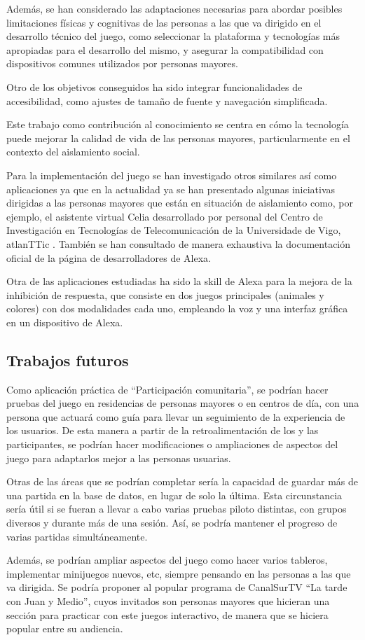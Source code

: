Además, se han considerado las adaptaciones necesarias para abordar posibles limitaciones físicas y cognitivas de las personas a las que va dirigido en el desarrollo técnico del juego, como seleccionar la plataforma y tecnologías más apropiadas para el desarrollo del mismo, y asegurar la compatibilidad con dispositivos comunes utilizados por personas mayores.

Otro de los objetivos conseguidos ha sido integrar funcionalidades de accesibilidad, como ajustes de tamaño de fuente y navegación simplificada.

Este trabajo como contribución al conocimiento se centra en cómo la tecnología puede mejorar la calidad de vida de las personas mayores, particularmente en el contexto del aislamiento social.

Para la implementación del juego se han investigado otros similares así como aplicaciones ya que en la actualidad ya se han presentado algunas iniciativas dirigidas a las personas mayores que están en situación de aislamiento como, por ejemplo, el asistente virtual Celia desarrollado por personal del Centro de Investigación en Tecnologías de Telecomunicación de la Universidade de Vigo, atlanTTic \parencite{celia-app}. También se han consultado de manera exhaustiva la documentación oficial de la página de desarrolladores de Alexa.

Otra de las aplicaciones estudiadas ha sido la skill de Alexa para la mejora de la inhibición de respuesta, que consiste en dos juegos principales (animales y colores) con dos modalidades cada uno, empleando la voz y una interfaz gráfica en un dispositivo de Alexa.

\subsection{Trabajos futuros}

Como aplicación práctica de \enquote{Participación comunitaria}, se podrían hacer pruebas del juego en residencias de personas mayores o en centros de día, con una persona que actuará como guía para llevar un seguimiento de la experiencia de los usuarios.
De esta manera a partir de la retroalimentación de los y las participantes, se podrían hacer modificaciones o ampliaciones de aspectos del juego para adaptarlos mejor a las personas usuarias.

Otras de las áreas que se podrían completar sería la capacidad de guardar más de una partida en la base de datos, en lugar de solo la última. Esta circunstancia sería útil si se fueran a llevar a cabo varias pruebas piloto distintas, con grupos diversos y durante más de una sesión. Así, se podría mantener el progreso de varias partidas simultáneamente.

Además, se podrían ampliar aspectos del juego como hacer varios tableros, implementar minijuegos nuevos, etc, siempre pensando en las personas a las que va dirigida. Se podría proponer al popular programa de CanalSurTV “La tarde con Juan y Medio”, cuyos invitados son personas mayores que hicieran una sección para practicar con este juegos interactivo, de manera que se hiciera popular entre su audiencia.

